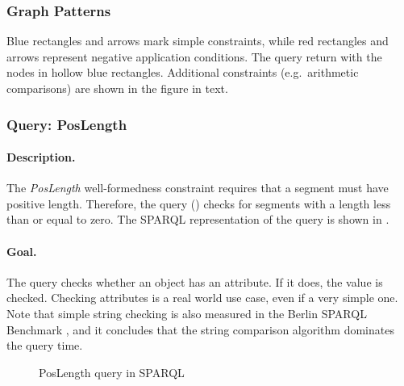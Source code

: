 \subsubsection{Graph Patterns}

Blue rectangles and arrows mark simple constraints, while red rectangles and arrows represent negative application conditions. The query return with the nodes in hollow blue rectangles. Additional constraints (e.g.\ arithmetic comparisons) are shown in the figure in text.

\subsubsection{Query: PosLength}

\paragraph{Description.} The \textit{PosLength} well-formedness constraint requires that a segment must have positive length. Therefore, the query () checks for segments with a length less than or equal to zero. The SPARQL representation of the query is shown in .

\paragraph{Goal.} The query checks whether an object has an attribute. If it does, the value is checked. Checking attributes is a real world use case, even if a very simple one. Note that simple string checking is also measured in the Berlin SPARQL Benchmark \cite{BSBM}, and it concludes that the string comparison algorithm dominates the query time.

\begin{figure}[Htb]
\centering
\begin{minipage}{0.5\textwidth}
  { \alignListing
    }
  \caption{PosLength query in SPARQL}
  \label{lst:poslength-sparql}
\end{minipage}
\end{figure}

% 
% 
% 
% 

